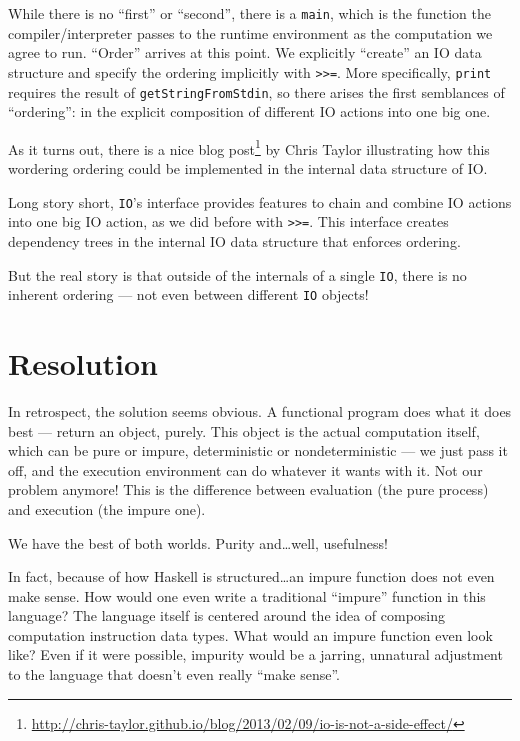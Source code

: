 \documentclass[]{article}
\renewcommand{\href}[2]{#2\footnote{\url{#1}}}
\begin{document}
While there is no ``first'' or ``second'', there is a \texttt{main}, which is
the function the compiler/interpreter passes to the runtime environment as the
computation we agree to run. ``Order'' arrives at this point. We explicitly
``create'' an IO data structure and specify the ordering implicitly with
\texttt{\textgreater{}\textgreater{}=}. More specifically, \texttt{print}
requires the result of \texttt{getStringFromStdin}, so there arises the first
semblances of ``ordering'': in the explicit composition of different IO actions
into one big one.

As it turns out, there is a
\href{http://chris-taylor.github.io/blog/2013/02/09/io-is-not-a-side-effect/}{nice
blog post} by Chris Taylor illustrating how this wordering ordering could be
implemented in the internal data structure of IO.

Long story short, \texttt{IO}'s interface provides features to chain and combine
IO actions into one big IO action, as we did before with
\texttt{\textgreater{}\textgreater{}=}. This interface creates dependency trees
in the internal IO data structure that enforces ordering.

But the real story is that outside of the internals of a single \texttt{IO},
there is no inherent ordering --- not even between different \texttt{IO}
objects!

\section{Resolution}\label{resolution}

In retrospect, the solution seems obvious. A functional program does what it
does best --- return an object, purely. This object is the actual computation
itself, which can be pure or impure, deterministic or nondeterministic --- we
just pass it off, and the execution environment can do whatever it wants with
it. Not our problem anymore! This is the difference between evaluation (the pure
process) and execution (the impure one).

We have the best of both worlds. Purity and\ldots well, usefulness!

In fact, because of how Haskell is structured\ldots an impure function does not
even make sense. How would one even write a traditional ``impure'' function in
this language? The language itself is centered around the idea of composing
computation instruction data types. What would an impure function even look
like? Even if it were possible, impurity would be a jarring, unnatural
adjustment to the language that doesn't even really ``make sense''.
\end{document}
